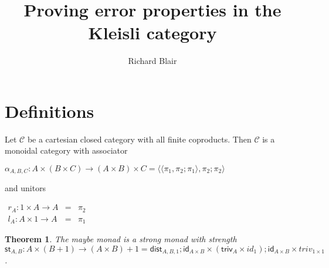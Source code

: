 \documentclass{article}[12pt]
\begin{document}
\let\mto\to                     %
\let\to\relax
\newcommand{\to}{\rightarrow}
\newcommand{\cat}[1]{\mathcal{#1}}

\newcommand{\id}[0]{\mathsf{id}}
\newcommand{\st}[0]{\mathsf{st}}
\newcommand{\ten}[0]{\mathsf{ten}}
\newcommand{\triv}[0]{\mathsf{triv}}
\newcommand{\dist}[0]{\mathsf{dist}}
\newcommand{\curry}[1]{\mathsf{curry}(#1)}
\newcommand{\curryinv}[1]{\mathsf{curry}^{-1}(#1)}
\newcommand{\error}[0]{\mathsf{error}}

\newtheorem{theorem}{Theorem}
\newtheorem{lemma}[theorem]{Lemma}

\title{Proving error properties in the Kleisli category}

\author{Richard Blair}

\maketitle

\section{Definitions}
Let $\cat{C}$ be a cartesian closed category with all finite coproducts.
Then $\cat{C}$ is a monoidal category with associator
\begin{center}
  \begin{math}
    \alpha_{A,B,C} : A \times (B \times C) \mto (A \times B) \times C = \langle \langle \pi_1 , \pi_2 ; \pi_1 \rangle , \pi_2 ; \pi_2 \rangle
  \end{math}
\end{center}
and unitors
\begin{center}
  \begin{math}
  \begin{array}{rll}
    r_A : 1 \times A \mto A & = & \pi_2 \\
    l_A : A \times 1 \mto A & = & \pi_1
  \end{array}
  \end{math}
\end{center}

\begin{theorem}
  The maybe monad is a strong monad with strength $\st_{A,B} : A \times (B + 1) \mto (A \times B) + 1 = \dist_{A,B,1};\id_{A \times B} \times (\triv_A \times id_1);\id_{A \times B} \times triv_{1 \times 1}$.
\end{theorem}
\end{document}
